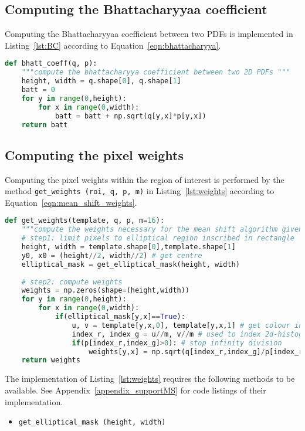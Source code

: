 \subsection{Computing the Bhattacharyyaa coefficient}
Computing the Bhattacharyyaa coefficient between two PDFs is implemented in
Listing~\ref{lst:BC} according to Equation~\ref{eqn:bhattacharyya}. 

\begin{lstlisting}[language=Python, caption={Function computing the Bhattacharyya coefficient}, captionpos=b, label={lst:BC}]
def bhatt_coeff(q, p):
    """compute the bhattacharyya coefficient between two 2D PDFs """
    height, width = q.shape[0], q.shape[1]
    batt = 0
    for y in range(0,height):
        for x in range(0,width):
            batt = batt + np.sqrt(q[y,x]*p[y,x])
    return batt
\end{lstlisting}

\subsection{Computing the pixel weights}
Computing the pixel weights within the region of interest is performed by the
method \lstinline{get_weights (roi, q, p, m)} in Listing~\ref{lst:weights} according to Equation~\ref{eqn:mean_shift_weights}.

\begin{lstlisting}[language=Python, caption={Function computing kernel Weights}, captionpos=b, label={lst:weights}]
def get_weights(template, q, p, m=16):
    """compute the weights necessary for the mean shift algorithm given q and p"""
    # step1: limit pixels to elliptical region inscribed in rectangle
    height, width = template.shape[0],template.shape[1]
    y0, x0 = (height//2, width//2) # get centre 
    elliptical_mask = get_elliptical_mask(height, width)
    
    # step2: compute weights
    weights = np.zeros(shape=(height,width))
    for y in range(0,height):
        for x in range(0,width): 
            if(elliptical_mask[y,x]==True):  
                u, v = template[y,x,0], template[y,x,1] # get colour index, u 
                index_r, index_g = u//m, v//m # used to index 2d-histogram
                if(p[index_r,index_g]>0): # stop infinity division
                    weights[y,x] = np.sqrt(q[index_r,index_g]/p[index_r,index_g]) # comp weight
    return weights 
\end{lstlisting}

The implementation of Listing~\ref{lst:weights} requires the following methods to
be available. See Appendix~\ref{appendix_supportMS} for code listings of their implementation. 
\begin{itemize}
    \item \lstinline{get_elliptical_mask (height, width)}
\end{itemize}

